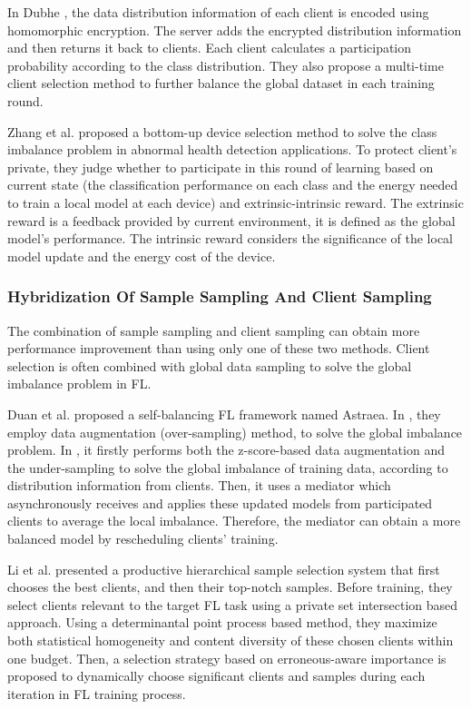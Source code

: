 \documentclass[10pt,journal,compsoc]{IEEEtran}
\begin{document}
	In Dubhe \cite{zhang2021dubhe}, the data distribution information of each client is encoded using homomorphic encryption. The server adds the encrypted distribution information and then returns it back to clients. Each client calculates a participation probability according to the class distribution. They also propose a multi-time client selection method to further balance the global dataset in each training round. 
	
	Zhang et al. \cite{zhang2021fedsens} proposed a bottom-up device selection method to solve the class imbalance problem in abnormal health detection applications. To protect client's private, they judge whether to participate in this round of learning based on current state (the classification performance on each class and the energy needed to train a local model at each device) and extrinsic-intrinsic reward. The extrinsic reward is a feedback provided by current environment, it is defined as the global model's performance. The intrinsic reward considers the significance of the local model update and the energy cost of the device. 
	
	\subsubsection{Hybridization Of Sample Sampling And Client Sampling}
	The combination of sample sampling and client sampling can obtain more performance improvement than using only one of these two methods. Client selection is often combined with global data sampling to solve the global imbalance problem in FL. 
	
	Duan et al. \cite{duan2019astraea}\cite{duan2020self} proposed a self-balancing FL framework named Astraea. In \cite{duan2019astraea}, they employ data augmentation (over-sampling) method, to solve the global imbalance problem. In \cite{duan2020self}, it firstly performs both the z-score-based data augmentation and the under-sampling to solve the global imbalance of training data, according to distribution information from clients. Then, it uses a mediator which asynchronously receives and applies these updated models from participated clients to average the local imbalance. Therefore, the mediator can obtain a more balanced model by rescheduling clients' training. 
	
	Li et al. \cite{li2021sample} presented a productive hierarchical sample selection system that first chooses the best clients, and then their top-notch samples. Before training, they select clients relevant to the target FL task using a private set intersection based approach. Using a determinantal point process based method, they maximize both statistical homogeneity and content diversity of these chosen clients within one budget. Then, a selection strategy based on erroneous-aware importance is proposed to dynamically choose significant clients and samples during each iteration in FL training process. 
	
\end{document}
